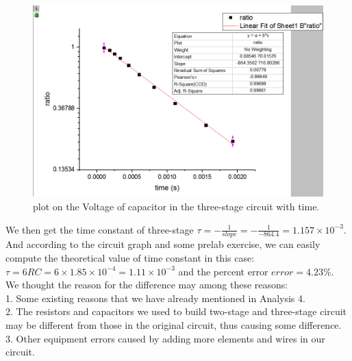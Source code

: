 \begin{figure}[htbp]
	\centering %
	\includegraphics[width=\linewidth]{images/2_8.PNG} %
	\caption{plot on the Voltage of capacitor in the three-stage circuit with time.} %
	\label{fig:2.8} %
\end{figure}
\phantom{ } We then get the time constant of three-stage 
$\tau = -\frac{1}{slope} = -\frac{1}{-864.4} = 1.157\times10^{-3} $.\\ And according to the circuit graph and some prelab exercise, we can easily compute
the theoretical value of time constant in this case:\\
$\tau = 6RC = 6\times1.85\times10^{-4} = 1.11\times10^{-3}$ and the percent error $error = 4.23\%$.\\
We thought the reason for the difference may among these reasons:\\
1. Some existing reasons that we have already mentioned in Analysis 4.\\
2. The resistors and capacitors we used to build two-stage and three-stage circuit may be different from those in the original circuit, thus causing some difference.\\
3. Other equipment errors caused by adding more elements and wires in our circuit.\\

